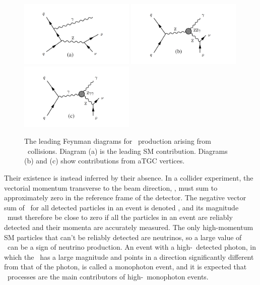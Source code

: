 \documentclass[oneside, letterpaper, 12pt, oldfontcommands]{memoir}
\begin{document}
\begin{figure}[htb]
  \begin{center}
    \includegraphics[width=0.49\textwidth]{Figures/zg_isr_v11.pdf}
    \includegraphics[width=0.49\textwidth]{Figures/zg_zzg_v11.pdf}
    \includegraphics[width=0.49\textwidth]{Figures/zg_zgg_v11.pdf}
    \caption{
      The leading Feynman diagrams for \zinvg\ production arising from \Pp\Pp\ collisions. Diagram (a) is the leading SM contribution.
      Diagrams (b) and (c) show contributions from aTGC vertices.
    }
    \label{fig:zinvg_diagrams}
  \end{center}
\end{figure}

Their existence is instead inferred by their absence.
In a collider experiment, the vectorial momentum transverse to the beam direction, \vecpT, must sum to approximately zero in the reference frame of the
detector. The negative vector sum of \vecpT\ for all detected particles in an event is denoted \vecMET, and its magnitude \MET\ must therefore be close
to zero if all the particles in an event are reliably detected and their momenta are accurately measured. The only high-momentum SM particles that can't
be reliably detected are neutrinos, so a large value of \MET\ can be a sign of neutrino production. An event with a high-\pT\ detected photon, in which
the \vecMET\ has a large magnitude and points in a direction significantly different from that of the photon, is called a monophoton event, and it is
expected that \zinvg\ processes are the main contributors of high-\pT\ monophoton events.
\end{document}
